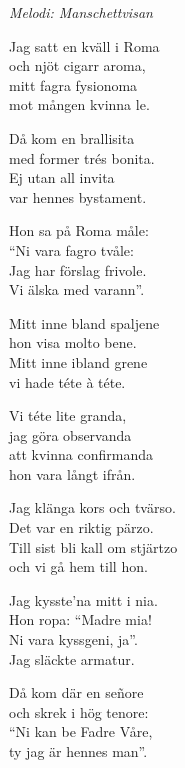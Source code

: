 {\footnotesize\textit{Melodi: Manschettvisan}}\par
\vspace{10pt}
Jag satt en kväll i Roma\\
och njöt cigarr aroma,\\
mitt fagra fysionoma\\
mot mången kvinna le.\par
\vspace{9pt}
Då kom en brallisita\\
med former trés bonita.\\
Ej utan all invita\\
var hennes bystament.\par
\vspace{9pt}
Hon sa på Roma måle:\\
``Ni vara fagro tvåle:\\
Jag har förslag frivole.\\
Vi älska med varann''.\par
\vspace{9pt}
Mitt inne bland spaljene\\
hon visa molto bene.\\
Mitt inne ibland grene\\
vi hade téte à téte.\par
\vspace{9pt}
Vi téte lite granda,\\
jag göra observanda\\
att kvinna confirmanda\\
hon vara långt ifrån.\par
\vspace{9pt}
Jag klänga kors och tvärso.\\
Det var en riktig pärzo.\\
Till sist bli kall om stjärtzo\\
och vi gå hem till hon.\par
\newpage
Jag kysste'na mitt i nia.\\
Hon ropa: ``Madre mia!\\
Ni vara kyssgeni, ja''.\\
Jag släckte armatur.\par
\vspace{7pt}
Då kom där en señore\\
och skrek i hög tenore:\\
``Ni kan be Fadre Våre,\\
ty jag är hennes man''.\par

